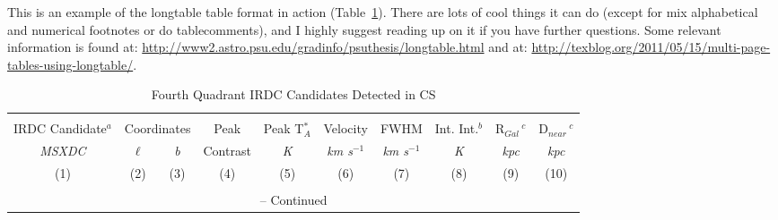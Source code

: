 This is an example of the longtable table format in action (Table~\ref{table:longtableexample}).  There are lots of cool things it can do (except for mix alphabetical and numerical footnotes or do tablecomments), and I highly suggest reading up on it if you have further questions.  Some relevant information is found at:  \url{http://www2.astro.psu.edu/gradinfo/psuthesis/longtable.html} and at:  \url{http://texblog.org/2011/05/15/multi-page-tables-using-longtable/}.
		\begin{landscape}%
		\begin{center}
		\begin{longtable}{lccccrcccc}%
	\caption[Fourth Quadrant IRDC Candidates Detected in CS]{Fourth Quadrant IRDC Candidates Detected in CS}\label{table:longtableexample}\\
\hline \hline \\[-2ex]
	\multicolumn{1}{c}{IRDC Candidate$^{a}$} &%
	\multicolumn{2}{c}{Coordinates} &
	\multicolumn{1}{c}{Peak} &
	\multicolumn{1}{c}{Peak T$_A^*$} &
	\multicolumn{1}{c}{Velocity} &
	\multicolumn{1}{c}{FWHM} &
	\multicolumn{1}{c}{Int. Int.$^{b}$} &%
	\multicolumn{1}{c}{R$_{Gal}\,^{c}$} &%
	\multicolumn{1}{c}{D$_{near}\,^{c}$} \\%
	\multicolumn{1}{c}{{\scriptsize \it MSXDC}} &
	\multicolumn{1}{c}{{\scriptsize \it $\ell$\degr}} & %
	\multicolumn{1}{c}{\scriptsize {\it{b}\degr}} &
	\multicolumn{1}{c}{Contrast} &
	\multicolumn{1}{c}{{\scriptsize \it K}} &
	\multicolumn{1}{c}{{\scriptsize \it km s$^{-1}$}} &
	\multicolumn{1}{c}{{\scriptsize \it km s$^{-1}$}} &
	\multicolumn{1}{c}{{\scriptsize \it K\kms}} &
	\multicolumn{1}{c}{{\scriptsize \it kpc}} &
	\multicolumn{1}{c}{{\scriptsize \it kpc}} \\
	\multicolumn{1}{c}{(1)} &
	\multicolumn{1}{c}{(2)} & %
	\multicolumn{1}{c}{(3)} &
	\multicolumn{1}{c}{(4)} &
	\multicolumn{1}{c}{(5)} &
	\multicolumn{1}{c}{(6)} &
	\multicolumn{1}{c}{(7)} &
	\multicolumn{1}{c}{(8)} &
	\multicolumn{1}{c}{(9)} &
	\multicolumn{1}{c}{(10)}\\[0.5ex] \hline \\[-1.8ex]
	\endfirsthead
	\multicolumn{10}{c}{{\tablename} \thetable{} -- Continued} \\[0.5ex]

\end{longtable}
\end{center}
\end{landscape}

